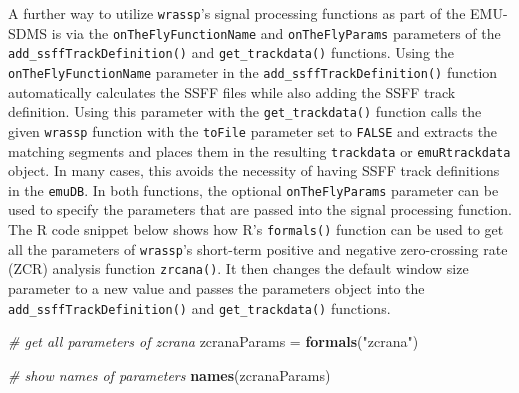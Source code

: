\documentclass[]{book}
\newenvironment{Shaded}{\begin{snugshade}}{\end{snugshade}}
\newcommand{\CommentTok}[1]{\textcolor[rgb]{0.56,0.35,0.01}{\textit{#1}}}
\newcommand{\DataTypeTok}[1]{\textcolor[rgb]{0.13,0.29,0.53}{#1}}
\newcommand{\DecValTok}[1]{\textcolor[rgb]{0.00,0.00,0.81}{#1}}
\newcommand{\KeywordTok}[1]{\textcolor[rgb]{0.13,0.29,0.53}{\textbf{#1}}}
\newcommand{\NormalTok}[1]{#1}
\newcommand{\OperatorTok}[1]{\textcolor[rgb]{0.81,0.36,0.00}{\textbf{#1}}}
\newcommand{\StringTok}[1]{\textcolor[rgb]{0.31,0.60,0.02}{#1}}
\begin{document}
\begin{Shaded}
\end{Shaded}

A further way to utilize \texttt{wrassp}'s signal processing functions as part of the EMU-SDMS is via the \texttt{onTheFlyFunctionName} and \texttt{onTheFlyParams} parameters of the \texttt{add\_ssffTrackDefinition()} and \texttt{get\_trackdata()} functions. Using the \texttt{onTheFlyFunctionName} parameter in the \texttt{add\_ssffTrackDefinition()} function automatically calculates the SSFF files while also adding the SSFF track definition. Using this parameter with the \texttt{get\_trackdata()} function calls the given \texttt{wrassp} function with the \texttt{toFile} parameter set to \texttt{FALSE} and extracts the matching segments and places them in the resulting \texttt{trackdata} or \texttt{emuRtrackdata} object. In many cases, this avoids the necessity of having SSFF track definitions in the \texttt{emuDB}. In both functions, the optional \texttt{onTheFlyParams} parameter can be used to specify the parameters that are passed into the signal processing function. The R code snippet below shows how R's \texttt{formals()} function can be used to get all the parameters of \texttt{wrassp}'s short-term positive and negative zero-crossing rate (ZCR) analysis function \texttt{zrcana()}. It then changes the default window size parameter to a new value and passes the parameters object into the \texttt{add\_ssffTrackDefinition()} and \texttt{get\_trackdata()} functions.

\begin{Shaded}
\begin{Highlighting}[]
\CommentTok{# get all parameters of zcrana}
\NormalTok{zcranaParams =}\StringTok{ }\KeywordTok{formals}\NormalTok{(}\StringTok{"zcrana"}\NormalTok{)}

\CommentTok{# show names of parameters}
\KeywordTok{names}\NormalTok{(zcranaParams)}
\end{Highlighting}
\end{Shaded}
\end{document}
